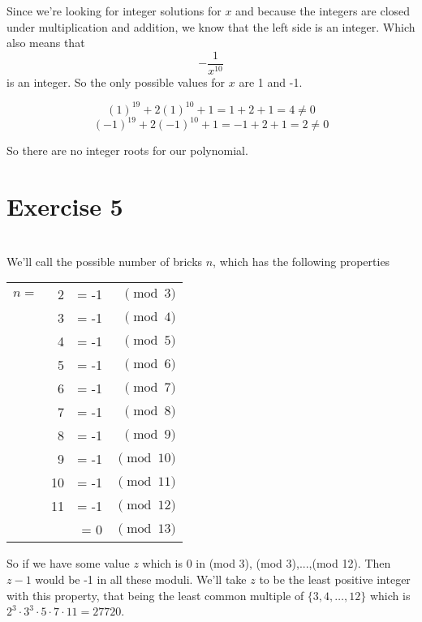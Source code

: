 \documentclass[12pt]{article}
\begin{document}
Since we're looking for integer solutions for $x$ and because the integers are closed under multiplication and addition, we know that the left side is an integer. Which also means that 
\[-\frac{1}{x^{10}}\]
is an integer. So the only possible values for $x$ are 1 and -1.

\[(1)^{19}+2(1)^{10}+1 = 1 + 2 + 1 = 4 \ne 0\]
\[(-1)^{19}+2(-1)^{10}+1 = -1 + 2 + 1 = 2 \ne 0\]

So there are no integer roots for our polynomial.

\newpage
\section*{Exercise 5}
\\

We'll call the possible number of bricks $n$, which has the following properties

\begin{center}
    \begin{tabular}{r r r r}
        $n=$&  2 &= -1 &  $\pmod{3}$ \\
            &  3 &= -1 &  $\pmod{4}$ \\
            &  4 &= -1 &  $\pmod{5}$ \\
            &  5 &= -1 &  $\pmod{6}$ \\
            &  6 &= -1 &  $\pmod{7}$ \\
            &  7 &= -1 &  $\pmod{8}$ \\
            &  8 &= -1 &  $\pmod{9}$ \\
            &  9 &= -1 & $\pmod{10}$ \\
            & 10 &= -1 & $\pmod{11}$ \\
            & 11 &= -1 & $\pmod{12}$ \\
            &    &=  0 & $\pmod{13}$
    \end{tabular}
\end{center}

So if we have some value $z$ which is 0 in (mod 3), (mod 3),...,(mod 12). Then $z-1$ would be -1 in all these moduli. We'll take $z$ to be the least positive integer with this property, that being the least common multiple of $\{3,4,\dots,12\}$ which is $2^3\cdot 3^3\cdot 5\cdot 7\cdot 11 = 27720$.
\end{document}
